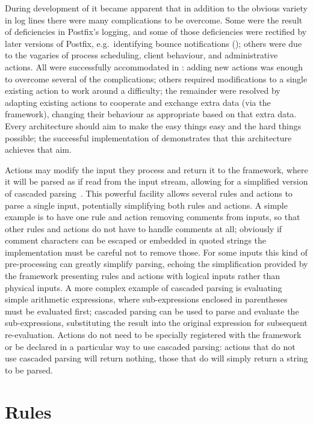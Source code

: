 During development of \parsername{} it became apparent that in addition to
the obvious variety in log lines there were many complications to be
overcome.  Some were the result of deficiencies in Postfix's logging, and
some of those deficiencies were rectified by later versions of Postfix,
e.g.\ identifying bounce notifications (); others were due to the vagaries of process scheduling,
client behaviour, and administrative actions.  All were successfully
accommodated in \parsername{}: adding new actions was enough to overcome
several of the complications; others required modifications to a single
existing action to work around a difficulty; the remainder were resolved by
adapting existing actions to cooperate and exchange extra data (via the
framework), changing their behaviour as appropriate based on that extra
data.  Every architecture should aim to make the easy things easy and the
hard things possible; the successful implementation of \parsername{}
demonstrates that this architecture achieves that aim.

Actions may modify the input they process and return it to the framework,
where it will be parsed as if read from the input stream, allowing for a
simplified version of cascaded parsing~\cite{cascaded-parsing}.  This
powerful facility allows several rules and actions to parse a single input,
potentially simplifying both rules and actions.  A simple example is to
have one rule and action removing comments from inputs, so that other rules
and actions do not have to handle comments at all; obviously if comment
characters can be escaped or embedded in quoted strings the implementation
must be careful not to remove those.  For some inputs this kind of
pre-processing can greatly simplify parsing, echoing the simplification
provided by the framework presenting rules and actions with logical inputs
rather than physical inputs.  A more complex example of cascaded parsing is
evaluating simple arithmetic expressions, where sub-expressions enclosed in
parentheses must be evaluated first; cascaded parsing can be used to parse
and evaluate the sub-expressions, substituting the result into the original
expression for subsequent re-evaluation.  Actions do not need to be
specially registered with the framework or be declared in a particular way
to use cascaded parsing: actions that do not use cascaded parsing will
return nothing, those that do will simply return a string to be parsed.

\section{Rules}


